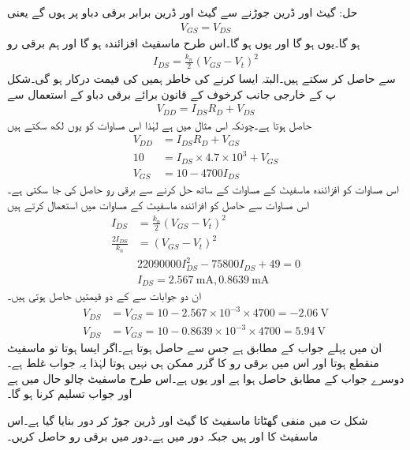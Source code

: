 حل:	گیٹ اور ڈرین جوڑنے سے گیٹ اور ڈرین برابر برقی دباو پر ہوں گے یعنی 
\begin{align*}
V_{GS}=V_{DS}
\end{align*}
ہو گا۔یوں    ہو گا اور یوں  ہو گا۔اس طرح ماسفیٹ افزائندہ ہو گا اور ہم برقی رو
\begin{align*}
I_{DS}=\frac{k_n}{2}\left(V_{GS}-V_t \right )^{2}
\end{align*}
سے حاصل کر سکتے ہیں۔البتہ ایسا کرنے کی خاطر ہمیں  کی قیمت درکار ہو گی۔شکل  پ کے خارجی جانب کرخوف کے قانون برائے برقی دباو کے استعمال سے 
\begin{align*}
V_{DD}=I_{DS} R_D+V_{DS}
\end{align*}
حاصل ہوتا ہے۔چونکہ اس مثال میں   ہے لہٰذا اس مساوات کو یوں لکھ سکتے ہیں
\begin{align*}
V_{DD}&=I_{DS}R_D+V_{GS}\\
10&=I_{DS} \times 4.7 \times 10^{3}+V_{GS}\\
V_{GS}&=10-4700 I_{DS}
\end{align*}
اس مساوات کو افزائندہ ماسفیٹ کے مساوات کے ساتھ حل کرنے سے برقی رو حاصل کی جا سکتی ہے۔اس مساوات سے حاصل  کو افزائندہ ماسفیٹ کے مساوات میں استعمال کرتے ہیں
\begin{align*}
I_{DS}&=\frac{k_n}{2} \left(V_{GS}-V_t \right )^2\\
\frac{2 I_{DS}}{k_n}&= \left(V_{GS}-V_t \right )^2\\
& 22090000I_{DS}^{2}-75800 I_{DS}+49=0\\
& I_{DS}=\SI{2.567}{\milli \ampere}, \SI{0.8639}{\milli \ampere}
\end{align*}
ان دو جوابات سے  کے دو قیمتیں حاصل ہوتی ہیں۔
\begin{align*}
V_{DS}&=V_{GS}=10-2.567 \times 10^{-3} \times 4700=\SI{-2.06}{\volt}\\
V_{DS}&=V_{GS}=10-0.8639 \times 10^{-3} \times 4700=\SI{5.94}{\volt}
\end{align*}
ان میں پہلے جواب کے مطابق  ہے جس سے  حاصل ہوتا ہے۔اگر ایسا ہوتا تو ماسفیٹ منقطع ہوتا اور اس میں برقی رو کا گزر ممکن ہی نہیں ہوتا لہٰذا یہ جواب غلط ہے۔دوسرے جواب کے مطابق    حاصل ہوا ہے اور یوں  ہے۔اس طرح ماسفیٹ چالو حال میں ہے اور جواب تسلیم کرنا ہو گا۔



 
شکل  ت میں منفی گھٹاتا ماسفیٹ کا گیٹ اور ڈرین جوڑ کر دور بنایا گیا ہے۔اس ماسفیٹ کا  اور  ہیں  جبکہ دور میں  ہے۔دور میں برقی رو حاصل کریں۔

